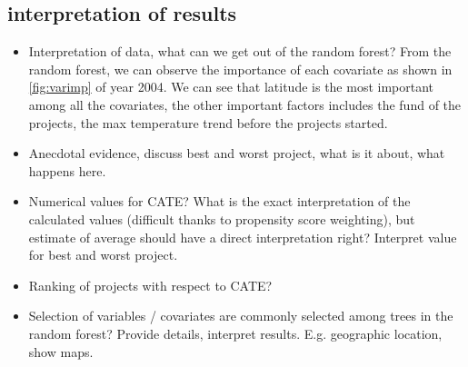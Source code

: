 \subsection{interpretation of results}
\begin{itemize}
\item Interpretation of data, what can we get out of the random forest?
From the random forest, we can observe the importance of each covariate as shown in \ref{fig:varimp} of year 2004. We can see that latitude is the most important among all the covariates, the other important factors includes the fund of the projects, the max temperature trend before the projects started. 
\item Anecdotal evidence, discuss best and worst project, what is it about, what happens here.

\item Numerical values for CATE? What is the exact interpretation of the calculated values (difficult thanks to propensity score weighting), but estimate of average should have a direct interpretation right? Interpret value for best and worst project.

\item Ranking of projects with respect to CATE?

\item Selection of variables / covariates are commonly selected among trees in the random forest? Provide details, interpret results. E.g. geographic location, show maps.


\end{itemize}
